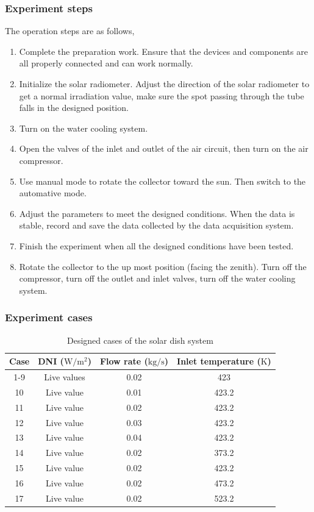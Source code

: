 \subsubsection{Experiment steps}
 The operation steps are as follows,
\begin{enumerate}[label=(\arabic*)]
	\item Complete the preparation work. Ensure that the devices and components are all properly connected and can work normally.
	\item Initialize the solar radiometer. Adjust the direction of the solar radiometer to get a normal irradiation value, make sure the spot passing through the tube falls in the designed position.
	\item Turn on the water cooling system.
	\item Open the valves of the inlet and outlet of the air circuit, then turn on the air compressor.
	\item Use manual mode to rotate the collector toward the sun. Then switch to the automative mode.
	\item Adjust the parameters to meet the designed conditions. When the data is stable, record and save the data collected by the data acquisition system.
	\item Finish the experiment when all the designed conditions have been tested. 
	\item Rotate the collector to the up most position (facing the zenith). Turn off the compressor, turn off the outlet and inlet valves, turn off the water cooling system.
\end{enumerate}

\subsubsection{Experiment cases}

\begin{table}[htbp]\footnotesize
	\caption{Designed cases of the solar dish system}
	\begin{center}
	\begin{tabular}{cccc}
		\toprule
		Case	& DNI ($\mathrm{W/m^2}$)	&	Flow rate ($\mathrm{kg/s}$)			&	Inlet temperature ($\mathrm{K}$)\\
		\midrule
		1-9	&	Live values	&	0.02	&	423\\
		10	&	Live value	&	0.01	&	423.2\\
		11	&	Live value	&	0.02	&	423.2\\
		12	&	Live value	&	0.03	&	423.2\\
		13	&	Live value	&	0.04	&	423.2\\
		14	&	Live value	&	0.02	&	373.2\\
		15	&	Live value	&	0.02	&	423.2\\
		16	&	Live value	&	0.02	&	473.2\\
		17	&	Live value	&	0.02	&	523.2\\
		\bottomrule
	\end{tabular}
	\end{center}
	\label{tab:DesignedCasesForDish}
\end{table}

